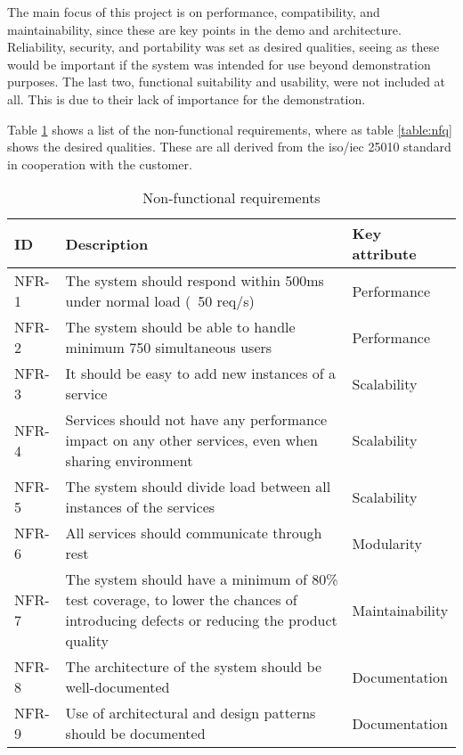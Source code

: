 The main focus of this project is on performance, compatibility, and maintainability, since these are key points in the demo and architecture. Reliability, security, and portability was set as desired qualities, seeing as these would be important if the system was intended for use beyond demonstration purposes. The last two, functional suitability and usability, were not included at all. This is due to their lack of importance for the demonstration.

Table \ref{table:nfr} shows a list of the non-functional requirements, where as table \ref{table:nfq} shows the desired qualities. These are all derived from the \acrshort{iso}/\acrshort{iec} 25010 standard in cooperation with the customer. 

\begin{table}[H] 
   \caption{Non-functional requirements}
   \centering
   \begin{tabular}{|p{1.5cm}|p{9.5cm}|p{4cm}|}\hline%
        ID & Description & Key attribute\\\hline\hline
        NFR-1 & The system should respond within 500ms under normal load (~50 req/s) & Performance \\ \hline
        NFR-2 & The system should be able to handle minimum 750 simultaneous users & Performance \\ \hline
        NFR-3 & It should be easy to add new instances of a service & Scalability \\ \hline
        NFR-4 & Services should not have any performance impact on any other services, even when sharing environment & Scalability \\     \hline
        NFR-5 & The system should divide load between all instances of the services & Scalability \\     \hline
        NFR-6 & All services should communicate through \acrshort{rest} & Modularity \\ \hline
        NFR-7 & The system should have a minimum of 80\% test coverage, to lower the chances of introducing defects or reducing the product quality & Maintainability \label{nfr:7} \\ \hline
        NFR-8 & The architecture of the system should be well-documented & Documentation \\ \hline
        NFR-9 & Use of architectural and design patterns should be documented & Documentation \\ \hline
    \end{tabular}
   \label{table:nfr}
\end{table}


